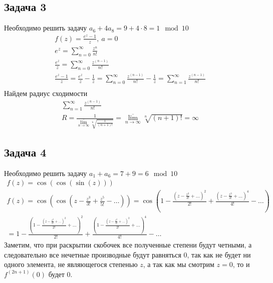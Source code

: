 \subsection*{Задача 3}
	Необходимо решить задачу $a_6 + 4a_8 = 9 + 4 \cdot 8 = 1 \mod 10$
	\begin{gather*}
		f(z) = \frac{e^z - 1}{z},\ a = 0\\
		e^z = \sum\limits_{n = 0}^{\infty} \frac{z^n}{n!}\\
		\frac{e^z}{z}
		= \sum\limits_{n = 0}^{\infty} \frac{z^{(n-1)}}{n!}\\
		\frac{e^z-1}{z}
		= \frac{e^z}{z} - \frac{1}{z}
		= \sum\limits_{n = 0}^{\infty} \frac{z^{(n-1)}}{n!} - \frac{1}{z}
		= \sum\limits_{n = 1}^{\infty} \frac{z^{(n-1)}}{n!}\\
	\end{gather*}
	Найдем радиус сходимости
	\begin{gather*}
		\sum\limits_{n = 1}^{\infty} \frac{z^{(n-1)}}{n!}\\
		R = \frac{1}{\overline{\lim\limits_{n \to \infty}}\sqrt[n]{\frac{1}{(n+1)!}}}
		= \overline{\lim\limits_{n \to \infty}}\sqrt[n]{(n+1)!} = \infty
	\end{gather*}
	\begin{comment}
		u_n = \frac{z^{(n-1)}}{n!}\\
		\left| \frac{u_{n+1}}{u_n}\right|
		= \left| \frac{\frac{z^{n}}{(n+1)!}}{\frac{z^{(n-1)}}{n!}} \right|
		= \left| \frac{z^n}{(n+1)z^{n-1}}\right|
		= \left| \frac{z}{(n+1)} \right|
		= \frac{|z|}{(n+1)} < 1\\
		|z| < 2
	\end{comment}
\vskip 0.4in

\subsection*{Задача 4}
	Необходимо решить задачу $a_1 + a_6 = 7 + 9 = 6 \mod 10$
	\begin{gather*}
		f(z) = \cos(\cos(\sin(z)))\\
		f(z) = \cos\left(\cos\left(z - \frac{z^3}{3!} + \frac{z^5}{5!} - \ldots\right)\right)
		= \cos\left(1 - \frac{\left(z - \frac{z^3}{3!} + \ldots\right)^2}{2!} + \frac{\left(z - \frac{z^3}{3!} + \ldots\right)^4}{4!} - \ldots\right)\\
		= 1 - \frac{\left(1 - \frac{\left(z - \frac{z^3}{3!} + \ldots\right)^2}{2!} + \ldots\right)^2}{2!} + \frac{\left(1 - \frac{\left(z - \frac{z^3}{3!} + \ldots\right)^2}{2!} + \ldots\right)^4}{4!} - \ldots
	\end{gather*}
	Заметим, что при раскрытии скобочек все полученные степени будут четными, а следовательно все нечетные производные будут равняться $0$, так как не будет ни одного элемента, не являющегося степенью $z$, а так как мы смотрим $z = 0$, то и $f^{(2n + 1)}(0)$ будет $0$.
\begin{comment}
		f(0) = \cos(\cos(\sin(0))) = \cos(1)\\
		f^{(1)}(0) = (\cos(\cos(\sin(0))))' = \sin(\sin(0))\cos(0)\sin(\cos(\sin(0))) = 0\\
		f^{(2)}(0) = \sin(1)\\
		f^{(3)}(0) = 0
\end{comment}
